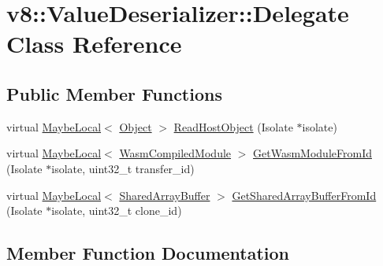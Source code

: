 \hypertarget{classv8_1_1ValueDeserializer_1_1Delegate}{}\section{v8\+:\+:Value\+Deserializer\+:\+:Delegate Class Reference}
\label{classv8_1_1ValueDeserializer_1_1Delegate}
\subsection*{Public Member Functions}
\begin{DoxyCompactItemize}
\item 
virtual \mbox{\hyperlink{classv8_1_1MaybeLocal}{Maybe\+Local}}$<$ \mbox{\hyperlink{classv8_1_1Object}{Object}} $>$ \mbox{\hyperlink{classv8_1_1ValueDeserializer_1_1Delegate_a8b06c19cba7e80c3c5271b0a2ca88a8a}{Read\+Host\+Object}} (Isolate $\ast$isolate)
\item 
virtual \mbox{\hyperlink{classv8_1_1MaybeLocal}{Maybe\+Local}}$<$ \mbox{\hyperlink{classv8_1_1WasmCompiledModule}{Wasm\+Compiled\+Module}} $>$ \mbox{\hyperlink{classv8_1_1ValueDeserializer_1_1Delegate_adcaa80ce590bbcfaac4929a9e7b49249}{Get\+Wasm\+Module\+From\+Id}} (Isolate $\ast$isolate, uint32\+\_\+t transfer\+\_\+id)
\item 
virtual \mbox{\hyperlink{classv8_1_1MaybeLocal}{Maybe\+Local}}$<$ \mbox{\hyperlink{classv8_1_1SharedArrayBuffer}{Shared\+Array\+Buffer}} $>$ \mbox{\hyperlink{classv8_1_1ValueDeserializer_1_1Delegate_a2b42c5b9a4a60bd614e0b343f6be31b5}{Get\+Shared\+Array\+Buffer\+From\+Id}} (Isolate $\ast$isolate, uint32\+\_\+t clone\+\_\+id)
\end{DoxyCompactItemize}


\subsection{Member Function Documentation}
\mbox{\label{classv8_1_1ValueDeserializer_1_1Delegate_a2b42c5b9a4a60bd614e0b343f6be31b5}} 
